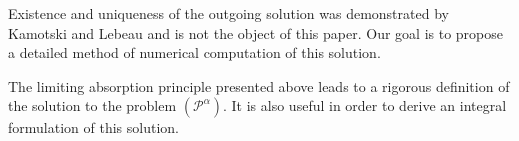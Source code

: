 Existence and uniqueness of the outgoing solution was demonstrated by Kamotski and Lebeau \cite{KamotskiLebeau} and is not the object of this paper. Our goal is to propose a detailed method of numerical computation of this solution.

The limiting absorption principle presented above leads to a rigorous definition of the solution to the problem $(\mathcal{P}^{\alpha})$. It is also useful in order to derive an integral formulation of this solution.
